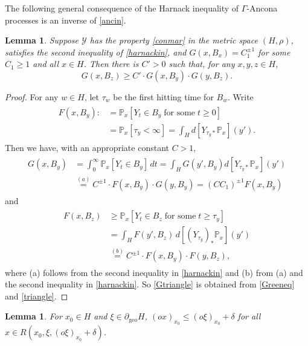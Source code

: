 \documentclass[12pt,a4paper]{amsart}
\numberwithin{equation}{section}
\newtheorem{lem}[equation]{Lemma}
\theoremstyle{definition}
\DeclareMathOperator{\geo}{geo}
\def\p{\mathbb P}
\begin{document}
The following general consequence of the Harnack inequality of $\Gamma$-Ancona processes is an inverse of \ref{ancin}.

\begin{lem}\label{Gtriangle}
Suppose $\mathcal{Y}$ has the property \ref{conmar} in the metric space $(H,\rho)$, satisfies the second inequality of \ref{harnackin}, and $G(x,B_x)=C_1^{\pm 1}$ for some $C_1\geq 1$ and all $x\in H$.
Then there is $C'>0$ such that, for any $x,y,z\in H$,
\begin{equation*}
G(x,B_z)\geq  C'\cdot G(x,B_y)\cdot G(y,B_z).
\end{equation*}
\end{lem}

\begin{proof}
For any $w\in H$, let $\tau_w$ be the first hitting time for $B_w$.
Write
\begin{align}\label{F}
\begin{split}
    F(x,B_y) :&= \p_x[Y_t\in B_y \;\text{for some}\; t\geq 0] \\
    &= \p_x[\tau_y<\infty] = \int_{H} d[Y_{\tau_y*}\p_x](y').   
\end{split}
\end{align}
Then we have, with an appropriate constant $C>1$,
\begin{align}\label{Greeneq}
\begin{split}
    G(x,B_y) &= \int_0^\infty \p_x[Y_t\in B_y]\,dt
    =\int_{H} G(y',B_y)d[Y_{\tau_y*}\p_x](y') \\
    &\overset{(a)}{=} C^{\pm 1}\cdot F(x,B_y)\cdot G(y,B_y) = (CC_1)^{\pm 1} F(x,B_y)
\end{split}    
\end{align}
and
\begin{align}\label{triangle}
\begin{split}
F(x,B_z) &\geq \p_x[Y_t\in B_z\;\text{for some}\; t\geq \tau_y] \\
&= \int_{H} F(y',B_z)\, d[(Y_{\tau_y})_\ast\p_x](y') \\
&\overset{(b)}{=}C^{\pm 1}\cdot  F(x,B_y)\cdot F(y,B_z),
\end{split}
\end{align}
where (a) follows from the second inequality in \ref{harnackin} and (b) from (a) and the second inequality in \ref{harnackin}. So \eqref{Gtriangle} is obtained from \eqref{Greeneq} and \eqref{triangle}.
\end{proof}

\begin{lem}\label{lemnotan}
For $x_0\in H$ and $\xi\in\partial_{\geo}H$,  $(ox)_{x_0}\le (o\xi)_{x_0}+\delta$ for all $x\in R(x_0,\xi,(o\xi)_{x_0}+\delta)$.
\end{lem}
\end{document}
